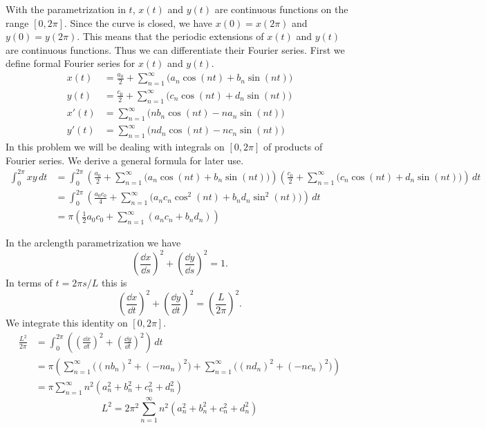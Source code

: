 {%
\begin{Solution}
  With the parametrization in $t$, $x(t)$ and $y(t)$ are continuous functions
  on the range $[0,2\pi]$.  Since the curve is closed, we have 
  $x(0) = x(2 \pi)$ and $y(0) = y(2\pi)$.  This means that the periodic 
  extensions of $x(t)$ and $y(t)$ are continuous functions.  Thus we can
  differentiate their Fourier series.  First we define formal Fourier
  series for $x(t)$ and $y(t)$.
  \begin{align*}
    x(t)    &= \frac{a_0}{2} + \sum_{n = 1}^\infty \big( a_n \cos(n t) 
    + b_n \sin(n t) \big) \\
    y(t)    &= \frac{c_0}{2} + \sum_{n = 1}^\infty \big( c_n \cos(n t) 
    + d_n \sin(n t) \big) \\
    x'(t)   &= \sum_{n = 1}^\infty \big( n b_n \cos(n t) 
    - n a_n \sin(n t) \big) \\
    y'(t)   &= \sum_{n = 1}^\infty \big( n d_n \cos(n t) 
    - n c_n \sin(n t) \big) 
  \end{align*}
  In this problem we will be dealing with integrals on $[0,2\pi]$ of products 
  of Fourier series.  We derive a general formula for later use.
  \begin{align*}
    \int_0^{2 \pi} x y \,d t
    &= \int_0^{2 \pi}  
    \left( \frac{a_0}{2} + \sum_{n = 1}^\infty \big( a_n \cos(n t) 
      + b_n \sin(n t) \big) \right)
    \left( \frac{c_0}{2} + \sum_{n = 1}^\infty \big( c_n \cos(n t) 
      + d_n \sin(n t) \big) \right)
    \,d t \\
    &= \int_0^{2 \pi}  
    \left( \frac{a_0 c_0}{4} + \sum_{n = 1}^\infty \big(
      a_n c_n \cos^2(n t) + b_n d_n \sin^2(n t) \big) \right)\,d t \\
    &= \pi \left( \frac{1}{2} a_0 c_0
      + \sum_{n = 1}^\infty ( a_n c_n + b_n d_n ) \right)
  \end{align*}

  In the arclength parametrization we have
  \[
  \left( \frac{\dd x}{\dd s} \right)^2 + \left( \frac{\dd y}{\dd s} \right)^2 = 1.
  \]
  In terms of $t = 2 \pi s / L$ this is
  \[
  \left( \frac{\dd x}{\dd t} \right)^2 + \left( \frac{\dd y}{\dd t} \right)^2 
  = \left( \frac{L}{2 \pi} \right)^2.
  \]
  We integrate this identity on $[0,2\pi]$.
  \begin{align*}
    \frac{ L^2 }{ 2 \pi }
    &= \int_0^{2 \pi} \left( \left( \frac{\dd x}{\dd t} \right)^2
      + \left( \frac{\dd y}{\dd t} \right)^2 \right) \,d t \\
    &= \pi \left( \sum_{n = 1}^\infty \big( (n b_n)^2 + (-n a_n)^2 \big)
      + \sum_{n = 1}^\infty \big( (n d_n)^2 + (-n c_n)^2 \big) \right) \\
    &= \pi \sum_{n = 1}^\infty n^2 ( a_n^2 + b_n^2 + c_n^2 + d_n^2 )
  \end{align*}
  \[
  L^2 = 2 \pi^2 \sum_{n = 1}^\infty n^2 ( a_n^2 + b_n^2 + c_n^2 + d_n^2 )
  \]


\end{Solution}}
